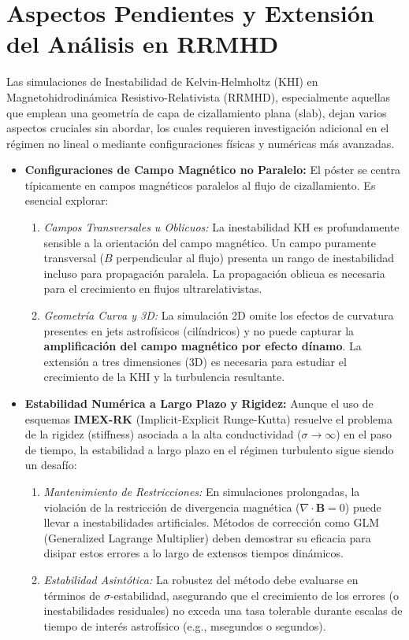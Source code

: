 
\section{Aspectos Pendientes y Extensión del Análisis en RRMHD}

Las simulaciones de Inestabilidad de Kelvin-Helmholtz (KHI) en Magnetohidrodinámica Resistivo-Relativista (RRMHD), especialmente aquellas que emplean una geometría de capa de cizallamiento plana (slab), dejan varios aspectos cruciales sin abordar, los cuales requieren investigación adicional en el régimen no lineal o mediante configuraciones físicas y numéricas más avanzadas.

\begin{itemize}
    \item \textbf{Configuraciones de Campo Magnético no Paralelo:} El póster se centra típicamente en campos magnéticos paralelos al flujo de cizallamiento. Es esencial explorar:
    \begin{enumerate}
        \item \textit{Campos Transversales u Oblicuos:} La inestabilidad KH es profundamente sensible a la orientación del campo magnético. Un campo puramente transversal ($B$ perpendicular al flujo) presenta un rango de inestabilidad incluso para propagación paralela. La propagación oblicua es necesaria para el crecimiento en flujos ultrarelativistas.
        \item \textit{Geometría Curva y 3D:} La simulación 2D omite los efectos de curvatura presentes en jets astrofísicos (cilíndricos) y no puede capturar la \textbf{amplificación del campo magnético por efecto dínamo}. La extensión a tres dimensiones (3D) es necesaria para estudiar el crecimiento de la KHI y la turbulencia resultante.
    \end{enumerate}

    \item \textbf{Estabilidad Numérica a Largo Plazo y Rigidez:} Aunque el uso de esquemas \textbf{IMEX-RK} (Implicit-Explicit Runge-Kutta) resuelve el problema de la rigidez (stiffness) asociada a la alta conductividad ($\sigma \to \infty$) en el paso de tiempo, la estabilidad a largo plazo en el régimen turbulento sigue siendo un desafío:
    \begin{enumerate}
        \item \textit{Mantenimiento de Restricciones:} En simulaciones prolongadas, la violación de la restricción de divergencia magnética ($\nabla \cdot \mathbf{B}=0$) puede llevar a inestabilidades artificiales. Métodos de corrección como GLM (Generalized Lagrange Multiplier) deben demostrar su eficacia para disipar estos errores a lo largo de extensos tiempos dinámicos.
        \item \textit{Estabilidad Asintótica:} La robustez del método debe evaluarse en términos de $\sigma$-estabilidad, asegurando que el crecimiento de los errores (o inestabilidades residuales) no exceda una tasa tolerable durante escalas de tiempo de interés astrofísico (e.g., msegundos o segundos).
    \end{enumerate}


\end{itemize}
